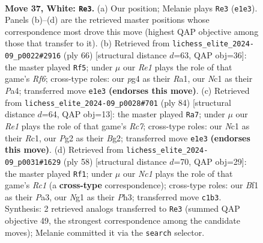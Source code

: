 \documentclass[11pt]{article}
\begin{document}
\clearpage

\begin{figure}[p]\centering
\begin{subfigure}{0.46\textwidth}\centering
\resizebox{\linewidth}{!}{%
\newchessgame
\chessboard[
  setfen={5r2/4r3/1p5k/p1p1nb2/P5p1/2P5/K5PP/2N1RBNR w - - 2 37},
  showmover=false,
  pgfstyle=straightmove, color=movearrow, markmove={e1-e3}
]}
\caption{}
\end{subfigure}\hfill
\begin{subfigure}{0.46\textwidth}\centering
\resizebox{\linewidth}{!}{%
\newchessgame
\chessboard[
  setfen={2k2br1/5p2/pB3R2/4n1P1/Ppp5/7p/1PP4P/R5K1 w - - 1 34},
  showmover=false,
  pgfstyle=straightmove, color=movearrow, markmove={f6-f5}
]}
\caption{}
\end{subfigure}
\\[4pt]
\begin{subfigure}{0.46\textwidth}\centering
\resizebox{\linewidth}{!}{%
\newchessgame
\chessboard[
  setfen={2N5/2R2pkn/p3n1p1/rb2p3/4P1Pp/4P2P/6B1/2R3K1 w - - 4 43},
  showmover=false,
  pgfstyle=straightmove, color=movearrow, markmove={c7-a7}
]}
\caption{}
\end{subfigure}\hfill
\begin{subfigure}{0.46\textwidth}\centering
\resizebox{\linewidth}{!}{%
\newchessgame
\chessboard[
  setfen={r7/p3Bb1k/Bp2p3/3pP1p1/6Pn/P6P/P7/2R3K1 w - - 2 30},
  showmover=false,
  pgfstyle=straightmove, color=movearrow, markmove={c1-f1}
]}
\caption{}
\end{subfigure}
\caption{\textbf{Move 37, White: \texttt{Re3}.} (a) Our position; Melanie plays \texttt{Re3} (\texttt{e1e3}). Panels (b)--(d) are the retrieved master positions whose correspondence most drove this move (highest QAP objective among those that transfer to it). (b) Retrieved from \texttt{lichess\_elite\_2024-09\_p0022\#2916} (ply 66) [structural distance $d$=63, QAP obj=36]: the master played \texttt{Rf5}; under $\mu$ our \emph{Re1} plays the role of that game's \emph{Rf6}; cross-type roles: our \emph{p}g4 as their \emph{R}a1, our \emph{N}c1 as their \emph{P}a4; transferred move \texttt{e1e3} \textbf{(endorses this move)}. (c) Retrieved from \texttt{lichess\_elite\_2024-09\_p0028\#701} (ply 84) [structural distance $d$=64, QAP obj=13]: the master played \texttt{Ra7}; under $\mu$ our \emph{Re1} plays the role of that game's \emph{Rc7}; cross-type roles: our \emph{N}c1 as their \emph{R}c1, our \emph{P}g2 as their \emph{B}g2; transferred move \texttt{e1e3} \textbf{(endorses this move)}. (d) Retrieved from \texttt{lichess\_elite\_2024-09\_p0031\#1629} (ply 58) [structural distance $d$=70, QAP obj=29]: the master played \texttt{Rf1}; under $\mu$ our \emph{Nc1} plays the role of that game's \emph{Rc1} (a \textbf{cross-type} correspondence); cross-type roles: our \emph{B}f1 as their \emph{P}a3, our \emph{N}g1 as their \emph{P}h3; transferred move \texttt{c1b3}. Synthesis: 2 retrieved analogs transferred to \texttt{Re3} (summed QAP objective 49, the strongest correspondence among the candidate moves); Melanie committed it via the \texttt{search} selector.}
\label{fig:thought-m72}
\end{figure}
\end{document}

